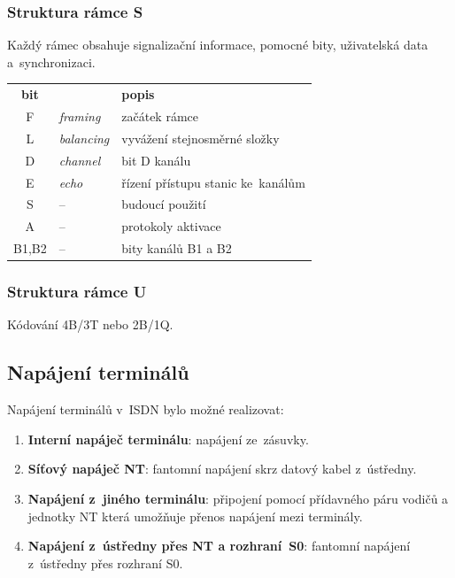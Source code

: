 \subsubsection{Struktura rámce S}

Každý rámec obsahuje signalizační informace, pomocné bity, uživatelská data a~synchronizaci.

\begin{center}
    \begin{tabular}{cll}
        \textbf{bit} &                  & \textbf{popis}                    \\
        F            & \emph{framing}   & začátek rámce                     \\
        L            & \emph{balancing} & vyvážení stejnosměrné složky      \\
        D            & \emph{channel}   & bit D kanálu                      \\
        E            & \emph{echo}      & řízení přístupu stanic ke~kanálům \\
        S            & --               & budoucí použití                   \\
        A            & --               & protokoly aktivace                \\
        B1,B2        & --               & bity kanálů B1 a B2               \\
    \end{tabular}
\end{center}


\subsubsection{Struktura rámce U}

Kódování 4B/3T nebo 2B/1Q.


\subsection{Napájení terminálů}

Napájení terminálů v~ISDN bylo možné realizovat:

\begin{enumerate}
    \item \textbf{Interní napáječ terminálu}: napájení ze~zásuvky.
    \item \textbf{Síťový napáječ NT}: fantomní napájení skrz datový kabel z~ústředny.
    \item \textbf{Napájení z~jiného terminálu}: připojení pomocí přídavného páru vodičů a jednotky NT která umožňuje přenos napájení mezi terminály.
    \item \textbf{Napájení z~ústředny přes NT a rozhraní~S0}: fantomní napájení z~ústředny přes rozhraní S0.
\end{enumerate}


